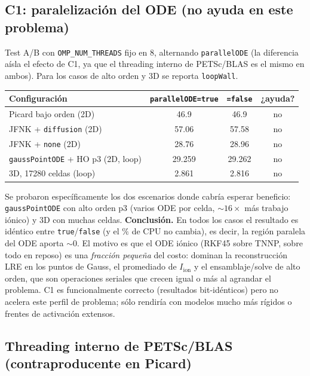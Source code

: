 \documentclass[11pt,a4paper]{article}
\newcommand{\code}[1]{\texttt{\small #1}}
\newcommand{\Iion}{I_{\mathrm{ion}}}
\newcommand{\dictkey}[1]{\textcolor{black!60!green}{\texttt{\footnotesize #1}}}
\begin{document}
\subsection{C1: paralelización del ODE (no ayuda en este problema)}
\label{sec:exp-C1}

Test A/B con \code{OMP\_NUM\_THREADS} fijo en 8, alternando \dictkey{parallelODE}
(la diferencia aísla el efecto de C1, ya que el threading interno de PETSc/BLAS es
el mismo en ambos). Para los casos de alto orden y 3D se reporta \code{loopWall}.

\begin{center}
\begin{tabular}{@{}lccc@{}}
\toprule
Configuración & \code{parallelODE=true} & \code{=false} & ¿ayuda? \\
\midrule
Picard bajo orden (2D)                 & 46.9  & 46.9  & no \\
JFNK + \code{diffusion} (2D)           & 57.06 & 57.58 & no \\
JFNK + \code{none} (2D)                & 28.76 & 28.96 & no \\
\code{gaussPointODE} + HO p3 (2D, loop)& 29.259 & 29.262 & no \\
3D, \num{17280} celdas (loop)          & 2.861 & 2.816 & no \\
\bottomrule
\end{tabular}
\end{center}

\noindent Se probaron específicamente los dos escenarios donde cabría esperar
beneficio: \dictkey{gaussPointODE} con alto orden p3 (varios ODE por celda,
$\sim\!16\times$ más trabajo iónico) y 3D con muchas celdas.
\textbf{Conclusión.} En todos los casos el resultado es idéntico entre
\code{true}/\code{false} (y el $\%$ de CPU no cambia), es decir, la región paralela
del ODE aporta $\sim 0$. El motivo es que el ODE iónico (RKF45 sobre TNNP, sobre
todo en reposo) es una \emph{fracción pequeña} del costo: dominan la reconstrucción
LRE en los puntos de Gauss, el promediado de $\Iion$ y el ensamblaje/solve de alto
orden, que son operaciones seriales que crecen igual o más al agrandar el problema.
C1 es funcionalmente correcto (resultados bit-idénticos) pero no acelera este perfil
de problema; sólo rendiría con modelos mucho más rígidos o frentes de activación
extensos.

\subsection{Threading interno de PETSc/BLAS (contraproducente en Picard)}
\label{sec:exp-threads}
\end{document}
